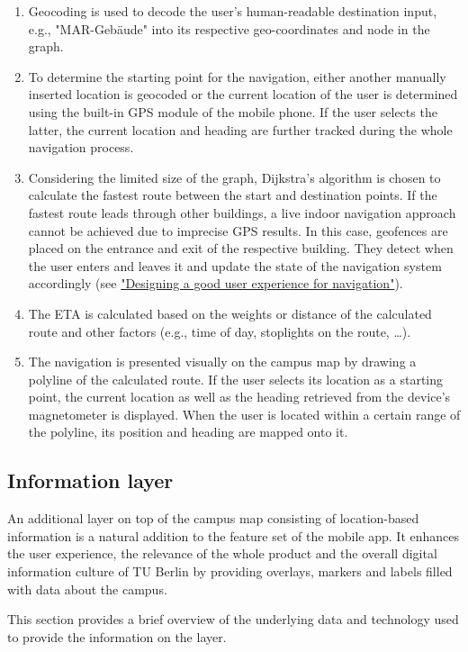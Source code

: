 \begin{enumerate}
    \item Geocoding is used to decode the user's human-readable destination input, e.g., "MAR-Gebäude" into its respective geo-coordinates and node in the graph.
    \item To determine the starting point for the navigation, either another manually inserted location is geocoded or the current location of the user is determined using the built-in GPS module of the mobile phone. If the user selects the latter, the current location and heading are further tracked during the whole navigation process.
    \item Considering the limited size of the graph, Dijkstra's algorithm is chosen to calculate the fastest route between the start and destination points. If the fastest route leads through other buildings, a live indoor navigation approach cannot be achieved due to imprecise GPS results. In this case, geofences are placed on the entrance and exit of the respective building. They detect when the user enters and leaves it and update the state of the navigation system accordingly (see \hyperref[sub:navigation_user_experience]{"Designing a good user experience for navigation"}).
    \item The ETA is calculated based on the weights or distance of the calculated route and other factors (e.g., time of day, stoplights on the route, \ldots).
    \item The navigation is presented visually on the campus map by drawing a polyline of the calculated route. If the user selects its location as a starting point, the current location as well as the heading retrieved from the device's magnetometer is displayed. When the user is located within a certain range of the polyline, its position and heading are mapped onto it.
\end{enumerate}

\subsection{Information layer}
An additional layer on top of the campus map consisting of location-based information is a natural addition to the feature set of the mobile app. It enhances the user experience, the relevance of the whole product and the overall digital information culture of TU Berlin by providing overlays, markers and labels filled with data about the campus.

This section provides a brief overview of the underlying data and technology used to provide the information on the layer.

